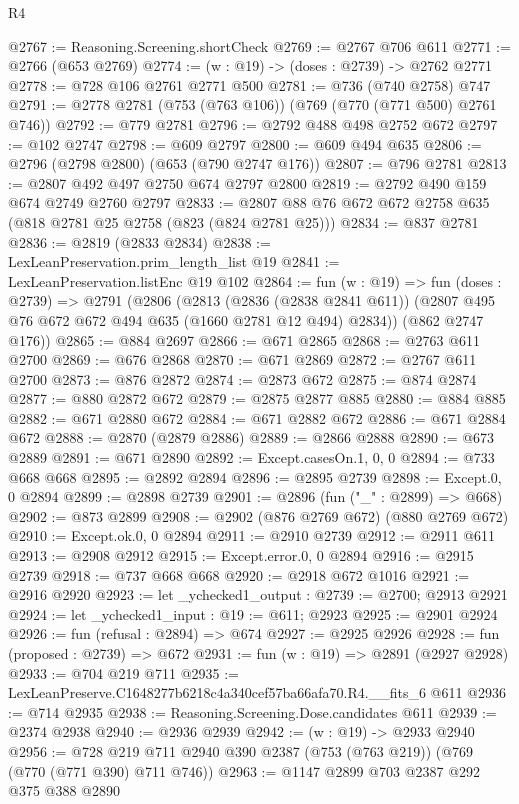 \begin{lexlean}{R4}
\begin{coremodule}
@2767 := Reasoning.Screening.shortCheck
@2769 := @2767 @706 @611
@2771 := @2766 (@653 @2769)
@2774 := (w : @19) -> (doses : @2739) -> @2762 @2771
@2778 := @728 @106 @2761 @2771 @500
@2781 := @736 (@740 @2758) @747
@2791 := @2778 @2781 (@753 (@763 @106)) (@769 (@770 (@771 @500) @2761 @746))
@2792 := @779 @2781
@2796 := @2792 @488 @498 @2752 @672
@2797 := @102 @2747
@2798 := @609 @2797
@2800 := @609 @494 @635
@2806 := @2796 (@2798 @2800) (@653 (@790 @2747 @176))
@2807 := @796 @2781
@2813 := @2807 @492 @497 @2750 @674 @2797 @2800
@2819 := @2792 @490 @159 @674 @2749 @2760 @2797
@2833 := @2807 @88 @76 @672 @672 @2758 @635 (@818 @2781 @25 @2758 (@823 (@824 @2781 @25)))
@2834 := @837 @2781
@2836 := @2819 (@2833 @2834)
@2838 := LexLeanPreservation.prim_length_list @19
@2841 := LexLeanPreservation.listEnc @19 @102
@2864 := fun (w : @19) =>
  fun (doses : @2739) =>
  @2791
    (@2806
      (@2813
        (@2836 (@2838 @2841 @611))
        (@2807 @495 @76 @672 @672 @494 @635 (@1660 @2781 @12 @494) @2834))
      (@862 @2747 @176))
@2865 := @884 @2697
@2866 := @671 @2865
@2868 := @2763 @611 @2700
@2869 := @676 @2868
@2870 := @671 @2869
@2872 := @2767 @611 @2700
@2873 := @876 @2872
@2874 := @2873 @672
@2875 := @874 @2874
@2877 := @880 @2872 @672
@2879 := @2875 @2877 @885
@2880 := @884 @885
@2882 := @671 @2880 @672
@2884 := @671 @2882 @672
@2886 := @671 @2884 @672
@2888 := @2870 (@2879 @2886)
@2889 := @2866 @2888
@2890 := @673 @2889
@2891 := @671 @2890
@2892 := Except.casesOn.{1, 0, 0}
@2894 := @733 @668 @668
@2895 := @2892 @2894
@2896 := @2895 @2739
@2898 := Except.{0, 0} @2894
@2899 := @2898 @2739
@2901 := @2896 (fun ("_" : @2899) => @668)
@2902 := @873 @2899
@2908 := @2902 (@876 @2769 @672) (@880 @2769 @672)
@2910 := Except.ok.{0, 0} @2894
@2911 := @2910 @2739
@2912 := @2911 @611
@2913 := @2908 @2912
@2915 := Except.error.{0, 0} @2894
@2916 := @2915 @2739
@2918 := @737 @668 @668
@2920 := @2918 @672 @1016
@2921 := @2916 @2920
@2923 := let _ychecked1_output : @2739 := @2700; @2913 @2921
@2924 := let _ychecked1_input : @19 := @611; @2923
@2925 := @2901 @2924
@2926 := fun (refusal : @2894) => @674
@2927 := @2925 @2926
@2928 := fun (proposed : @2739) => @672
@2931 := fun (w : @19) => @2891 (@2927 @2928)
@2933 := @704 @219 @711
@2935 := LexLeanPreserve.C1648277b6218c4a340cef57ba66afa70.R4.__fits_6 @611
@2936 := @714 @2935
@2938 := Reasoning.Screening.Dose.candidates @611
@2939 := @2374 @2938
@2940 := @2936 @2939
@2942 := (w : @19) -> @2933 @2940
@2956 := @728 @219 @711 @2940 @390 @2387 (@753 (@763 @219)) (@769 (@770 (@771 @390) @711 @746))
@2963 := @1147 @2899 @703 @2387 @292 @375 @388 @2890

\end{coremodule}
\end{lexlean}
